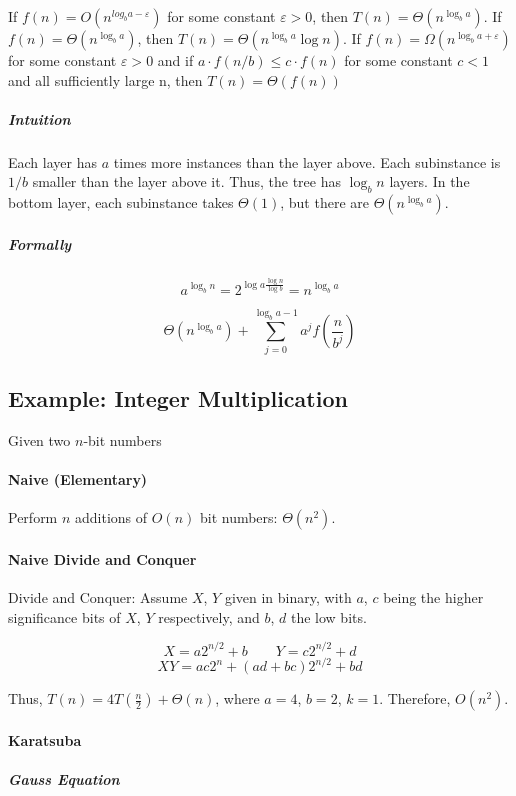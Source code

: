 \documentclass[a4paper]{article}
\begin{document}
If $f(n)=O(n^{log_ba-\varepsilon})$ for some constant $\varepsilon>0$, then $T(n)=\Theta(n^{\log_ba})$.
If $f(n)=\Theta(n^{\log_ba})$, then $T(n)=\Theta(n^{\log_ba}\log n)$.
If $f(n)=\Omega(n^{\log_ba+\varepsilon})$ for some constant $\varepsilon>0$ and if $a\cdot f(n/b)\le c\cdot f(n)$ for some constant $c<1$ and all sufficiently large n, then $T(n)=\Theta(f(n))$

\subparagraph{Intuition}
Each layer has $a$ times more instances than the layer above. Each subinstance is $1/b$ smaller than the layer above it. Thus, the tree has $\log_bn$ layers. In the bottom layer, each subinstance takes $\Theta(1)$, but there are $\Theta(n^{\log_ba})$.

\subparagraph{Formally}

\[a^{\log_b n} = 2^{\log a\frac{\log n}{\log b}} = n^{\log_b a}\]

\[
\Theta(n^{\log_ba})+\sum\limits_{j=0}^{\log_ba-1}a^j f(\frac{n}{b^j})
\]

\subsection{Example: Integer Multiplication}

Given two $n$-bit numbers

\paragraph{Naive (Elementary)}

Perform $n$ additions of $O(n)$ bit numbers: $\Theta(n^2)$.

\paragraph{Naive Divide and Conquer}

Divide and Conquer: Assume $X$, $Y$ given in binary, with $a$, $c$ being the higher significance bits of $X$, $Y$ respectively, and $b$, $d$ the low bits.

\[ X=a2^{n/2}+b\qquad Y=c2^{n/2}+d \]
\[ XY=ac2^n+(ad+bc)2^{n/2}+bd \]

Thus, $T(n)=4T(\frac{n}{2})+\Theta(n)$, where $a=4$, $b=2$, $k=1$. Therefore, $O(n^2)$.

\paragraph{Karatsuba}

\subparagraph{Gauss Equation}
\end{document}
